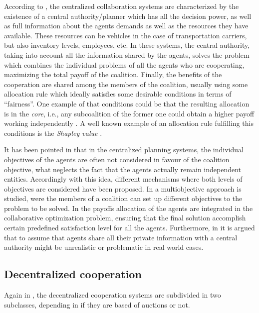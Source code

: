 \documentclass{article}
\begin{document}
According to \textcite{GANSTERER2017}, the centralized collaboration systems are characterized by the existence of a central authority/planner which has all the decision power, as well as full information about the agents demands as well as the resources they have available. These resources can be vehicles in the case of transportation carriers, but also inventory levels, employees, etc. In these systems, the central authority, taking into account all the information shared by the agents, solves the problem which combines the individual problems of all the agents who are cooperating,  maximizing the total payoff of the coalition. Finally, the benefits of the cooperation are shared among the members of the coalition, usually using some allocation rule which ideally satisfies some desirable conditions in terms of ``fairness''. One example of that conditions could be that the resulting allocation is in the \emph{core}, i.e., any subcoalition of the former one could obtain a higher payoff working
independently \parencite{GONZALEZ2010}. A well known example of an allocation rule fulfilling this conditions is the \emph{Shapley value} \parencite{SHAPLEY1952}.

It has been pointed in \textcite{DEFRYN2018891} that in the centralized planning systems, the individual objectives
of the agents are often not considered in favour of the coalition objective, what neglects the fact that the agents actually remain independent entities.  Accordingly with this idea, different mechanisms where both levels of objectives are
considered have been proposed. In \textcite{DEFRYN20191} a multiobjective approach is studied, were the members of a coalition can set up different objectives to the problem to be solved. In \textcite{VANOVERMEIRE2014125} the payoffs allocation of the agents are integrated in the collaborative optimization problem, ensuring that the final solution accomplish certain predefined satisfaction level for all the agents. Furthermore, in \textcite{SERRANO2017}  it is argued that to assume that agents share all their private information with a central authority might be unrealistic or problematic in real world cases.


\subsection{Decentralized cooperation}

Again in \textcite{GANSTERER2017}, the decentralized cooperation systems are subdivided in two subclasses, depending in if they are based of auctions or not.
\end{document}
